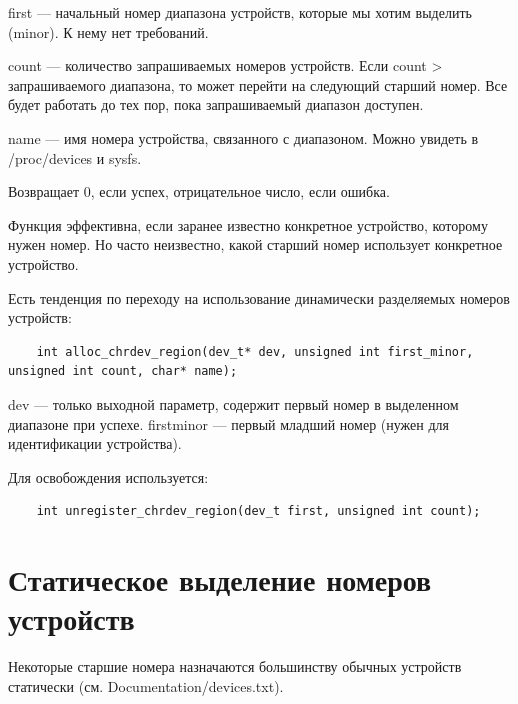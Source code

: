 first --- начальный номер диапазона устройств, которые мы хотим выделить (minor). К нему нет требований.

count --- количество запрашиваемых номеров устройств. Если count > запрашиваемого диапазона, то может перейти на следующий старший номер. Все будет работать до тех пор, пока запрашиваемый диапазон доступен. 

name --- имя номера устройства, связанного с диапазоном. Можно увидеть в /proc/devices и sysfs.

Возвращает 0, если успех, отрицательное число, если ошибка. 

Функция эффективна, если заранее известно конкретное устройство, которому нужен номер. Но часто неизвестно, какой старший номер использует конкретное устройство.

Есть тенденция по переходу на использование динамически разделяемых номеров устройств:

\begin{lstlisting}
	int alloc_chrdev_region(dev_t* dev, unsigned int first_minor, unsigned int count, char* name);
\end{lstlisting}

dev --- только выходной параметр, содержит первый номер в выделенном диапазоне при успехе. firstminor --- первый младший номер (нужен для идентификации устройства).

Для освобождения используется:

\begin{lstlisting}
	int unregister_chrdev_region(dev_t first, unsigned int count);
\end{lstlisting}

\section{Статическое выделение номеров устройств}
Некоторые старшие номера назначаются большинству обычных устройств статически (см. Documentation/devices.txt). 

